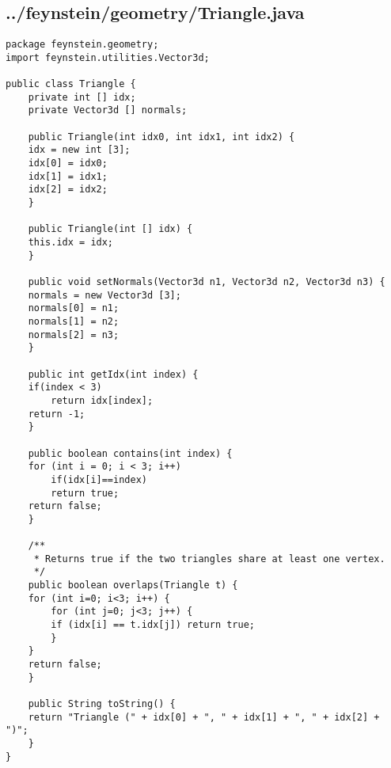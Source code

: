 \subsection*{../feynstein/geometry/Triangle.java}
\begin{lstlisting}
package feynstein.geometry;
import feynstein.utilities.Vector3d;

public class Triangle {
    private int [] idx;
    private Vector3d [] normals;
	
    public Triangle(int idx0, int idx1, int idx2) {
	idx = new int [3];
	idx[0] = idx0;
	idx[1] = idx1;
	idx[2] = idx2;
    }
	
    public Triangle(int [] idx) {
	this.idx = idx;
    }
	
    public void setNormals(Vector3d n1, Vector3d n2, Vector3d n3) {
	normals = new Vector3d [3];
	normals[0] = n1;
	normals[1] = n2;
	normals[2] = n3;
    }
	
    public int getIdx(int index) {
	if(index < 3)
	    return idx[index];
	return -1;
    }

    public boolean contains(int index) {
	for (int i = 0; i < 3; i++)
	    if(idx[i]==index)
		return true;
	return false;
    }

    /**
     * Returns true if the two triangles share at least one vertex.
     */
    public boolean overlaps(Triangle t) {
	for (int i=0; i<3; i++) {
	    for (int j=0; j<3; j++) {
		if (idx[i] == t.idx[j]) return true;
	    }
	}
	return false;
    }

    public String toString() {
	return "Triangle (" + idx[0] + ", " + idx[1] + ", " + idx[2] + ")";
    }
}\end{lstlisting}

